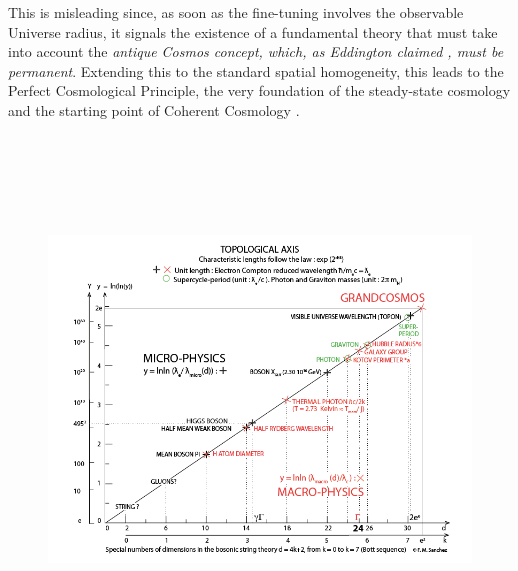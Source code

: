 \documentclass[twoside,draft]{article}
\begin{document}
\begin{sloppypar}
This is misleading since, as soon as the fine-tuning involves the observable Universe radius, it signals the existence of a fundamental theory that must take into account the \textit{antique Cosmos concept, which, as Eddington claimed \cite{Eddington}, must be permanent}. Extending this to the standard spatial homogeneity, this leads to the Perfect Cosmological Principle, the very foundation of the steady-state cosmology and the starting point of Coherent Cosmology \cite{Sanchez1}.


\begin{figure}
\centering
\includegraphics[width=\textwidth,height=14cm]{./figures/figure}

\end{figure}
\end{sloppypar}
\end{document}
